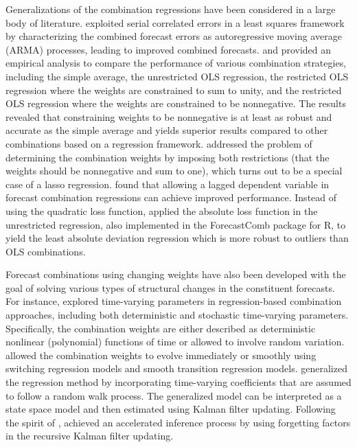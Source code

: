 \documentclass[a4paper,11pt]{article}
\newcommand{\pkg}[1]{{\normalfont\fontseries{b}\selectfont #1}}
\let\proglang=\textsf
\begin{document}
Generalizations of the combination regressions have been considered in a large body of literature. \citet{Diebold1988-sx} exploited serial correlated errors in a least squares framework by characterizing the combined forecast errors as autoregressive moving average (ARMA) processes, leading to improved combined forecasts. \citet{Gunter1992-go} and \citet{Aksu1992-lb} provided an empirical analysis to compare the performance of various combination strategies, including the simple average, the unrestricted OLS regression, the restricted OLS regression where the weights are constrained to sum to unity, and the restricted OLS regression where the weights are constrained to be nonnegative. The results revealed that constraining weights to be nonnegative is at least as robust and accurate as the simple average and yields superior results compared to other combinations based on a regression framework. \citet{Conflitti2015-fq} addressed the problem of determining the combination weights by imposing both restrictions (that the weights should be nonnegative and sum to one), which turns out to be a special case of a lasso regression. \citet{Edward_Coulson1993-db} found that allowing a lagged dependent variable in forecast combination regressions can achieve improved performance. Instead of using the quadratic loss function, \citet{Nowotarski2014-ev} applied the absolute loss function in the unrestricted regression, also implemented in the \pkg{ForecastComb} package for \proglang{R}, to yield the least absolute deviation regression which is more robust to outliers than OLS combinations.

Forecast combinations using changing weights have also been developed with the goal of solving various types of structural changes in the constituent forecasts. For instance, \citet{Diebold1987-go} explored time-varying parameters in regression-based combination approaches, including both deterministic and stochastic time-varying parameters. Specifically, the combination weights are either described as deterministic nonlinear (polynomial) functions of time or allowed to involve random variation. \citet{Deutsch1994-ob} allowed the combination weights to evolve immediately or smoothly using switching regression models and smooth transition regression models. \citet{Terui2002-df} generalized the regression method by incorporating time-varying coefficients that are assumed to follow a random walk process. The generalized model can be interpreted as a state space model and then estimated using Kalman filter updating. Following the spirit of \citet{Terui2002-df}, \citet{Raftery2010-qe} achieved an accelerated inference process by using forgetting factors in the recursive Kalman filter updating.
\end{document}
